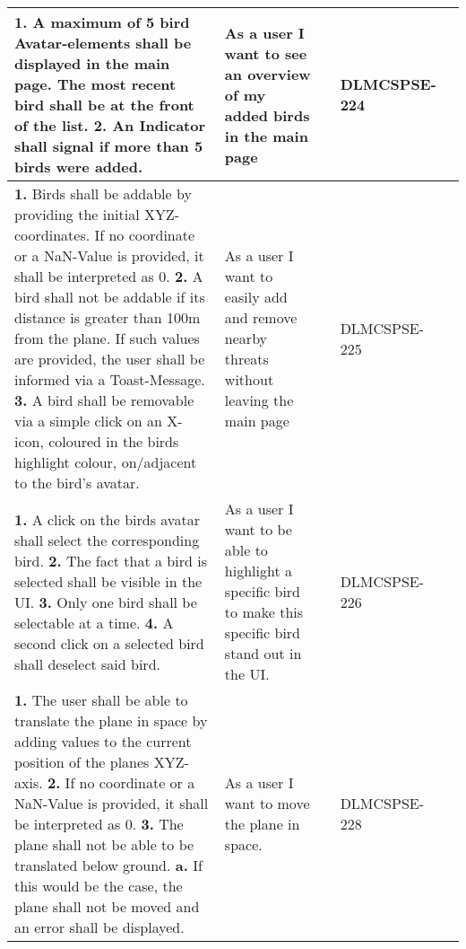\begin{xltabular}{\textwidth}{|X|X|M{1.8cm}|M{1.4cm}|M{1.3cm}|}
\hline 
 \endlastfoot 
\textbf{1.} A maximum of 5 bird Avatar-elements shall be displayed in the main page. The most recent bird shall be at the front of the list. \newline \textbf{2.} An Indicator shall signal if more than 5 birds were added. & As a user I want to see an overview of my added birds in the main page &  & {\color{purpleT}\ttfamily DLMCSPSE-224} &  \\ \hline 
  \textbf{1.} Birds shall be addable by providing the initial XYZ-coordinates. If no coordinate or a NaN-Value is provided, it shall be interpreted as 0. \newline \textbf{2.} A bird shall not be addable if its distance is greater than 100m from the plane. If such values are provided, the user shall be informed via a Toast-Message. \newline \textbf{3.} A bird shall be removable via a simple click on an X-icon, coloured in the birds highlight colour, on/adjacent to the bird’s avatar. & As a user I want to easily add and remove nearby threats without leaving the main page &  & {\color{purpleT}\ttfamily DLMCSPSE-225} &  \\ \hline 
  \textbf{1.} A click on the birds avatar shall select the corresponding bird. \newline \textbf{2.} The fact that a bird is selected shall be visible in the UI. \newline \textbf{3.} Only one bird shall be selectable at a time. \newline \textbf{4.} A second click on a selected bird shall deselect said bird. \newline & As a user I want to be able to highlight a specific bird to make this specific bird stand out in the UI. &  & {\color{purpleT}\ttfamily DLMCSPSE-226} &  \\ \hline 
  \textbf{1.} The user shall be able to translate the plane in space by adding values to the current position of the planes XYZ-axis. \newline \newline \textbf{2.} If no coordinate or a NaN-Value is provided, it shall be interpreted as 0. \newline \newline \textbf{3.} The plane shall not be able to be translated below ground. \newline \textbf{a.}  If this would be the case, the plane shall not be moved and an error shall be displayed. & As a user I want to move the plane in space. &  & {\color{purpleT}\ttfamily DLMCSPSE-228} &  \\ \hline 

\end{xltabular}
